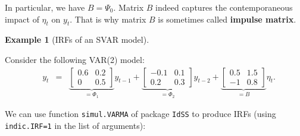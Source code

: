 \documentclass[
  12pt,
]{book}
\theoremstyle{definition}
\theoremstyle{definition}
\newtheorem{example}{Example}[chapter]
\theoremstyle{definition}
\theoremstyle{definition}
\theoremstyle{remark}
\begin{document}
In particular, we have \(B = \Psi_0\). Matrix \(B\) indeed captures the contemporaneous impact of \(\eta_t\) on \(y_t\). That is why matrix \(B\) is sometimes called \textbf{impulse matrix}.

\begin{example}[IRFs of an SVAR model]
\protect\hypertarget{exm:IRFVAR}{}\label{exm:IRFVAR}

Consider the following VAR(2) model:
\begin{eqnarray}
\quad y_t &=&
\underbrace{\left[\begin{array}{cc}
0.6 & 0.2 \\
0 & 0.5
\end{array}\right]}_{=\Phi_1}
y_{t-1} +  
\underbrace{\left[\begin{array}{cc}
-0.1 & 0.1 \\
0.2 & 0.3
\end{array}\right]}_{=\Phi_2}y_{t-2} + \underbrace{\left[\begin{array}{cc}
0.5 & 1.5 \\
-1 & 0.8
\end{array}\right]}_{=B} \eta_{t}.
\label{eq:VAR111}
\end{eqnarray}

We can use function \texttt{simul.VARMA} of package \texttt{IdSS} to produce IRFs (using \texttt{indic.IRF=1} in the list of arguments):


\end{example}
\end{document}
